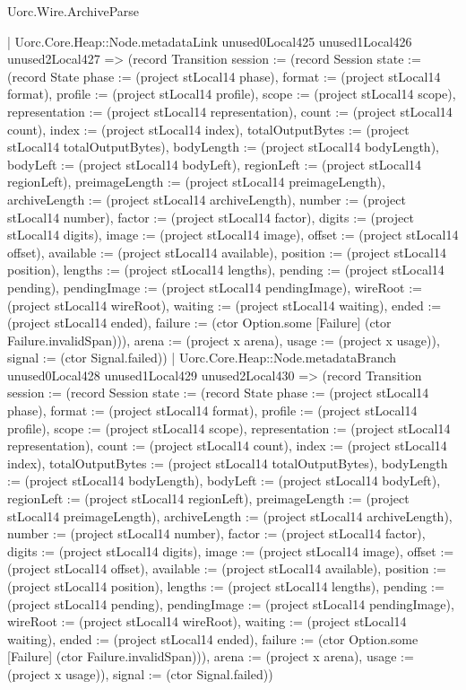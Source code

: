 \begin{lexlean}{Uorc.Wire.ArchiveParse}
\begin{semanticmodule}
{            | Uorc.Core.Heap::Node.metadataLink unused0Local425 unused1Local426 unused2Local427 => (record Transition {session := (record Session {state := (record State {phase := (project stLocal14 phase), format := (project stLocal14 format), profile := (project stLocal14 profile), scope := (project stLocal14 scope), representation := (project stLocal14 representation), count := (project stLocal14 count), index := (project stLocal14 index), totalOutputBytes := (project stLocal14 totalOutputBytes), bodyLength := (project stLocal14 bodyLength), bodyLeft := (project stLocal14 bodyLeft), regionLeft := (project stLocal14 regionLeft), preimageLength := (project stLocal14 preimageLength), archiveLength := (project stLocal14 archiveLength), number := (project stLocal14 number), factor := (project stLocal14 factor), digits := (project stLocal14 digits), image := (project stLocal14 image), offset := (project stLocal14 offset), available := (project stLocal14 available), position := (project stLocal14 position), lengths := (project stLocal14 lengths), pending := (project stLocal14 pending), pendingImage := (project stLocal14 pendingImage), wireRoot := (project stLocal14 wireRoot), waiting := (project stLocal14 waiting), ended := (project stLocal14 ended), failure := (ctor Option.some [Failure] (ctor Failure.invalidSpan))}), arena := (project x arena), usage := (project x usage)}), signal := (ctor Signal.failed)})
            | Uorc.Core.Heap::Node.metadataBranch unused0Local428 unused1Local429 unused2Local430 => (record Transition {session := (record Session {state := (record State {phase := (project stLocal14 phase), format := (project stLocal14 format), profile := (project stLocal14 profile), scope := (project stLocal14 scope), representation := (project stLocal14 representation), count := (project stLocal14 count), index := (project stLocal14 index), totalOutputBytes := (project stLocal14 totalOutputBytes), bodyLength := (project stLocal14 bodyLength), bodyLeft := (project stLocal14 bodyLeft), regionLeft := (project stLocal14 regionLeft), preimageLength := (project stLocal14 preimageLength), archiveLength := (project stLocal14 archiveLength), number := (project stLocal14 number), factor := (project stLocal14 factor), digits := (project stLocal14 digits), image := (project stLocal14 image), offset := (project stLocal14 offset), available := (project stLocal14 available), position := (project stLocal14 position), lengths := (project stLocal14 lengths), pending := (project stLocal14 pending), pendingImage := (project stLocal14 pendingImage), wireRoot := (project stLocal14 wireRoot), waiting := (project stLocal14 waiting), ended := (project stLocal14 ended), failure := (ctor Option.some [Failure] (ctor Failure.invalidSpan))}), arena := (project x arena), usage := (project x usage)}), signal := (ctor Signal.failed)})
}
\end{semanticmodule}
\end{lexlean}
